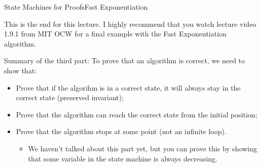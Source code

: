 \begin{frame}{State Machines for Proofs}{Fast Exponentiation}

  This is the end for this lecture. I highly recommend that you watch lecture video 1.9.1 from MIT OCW for a final example with the Fast Exponentiation algorithm.\bigskip

  Summary of the third part: To prove that an algorithm is correct, we need to show that:
  \begin{itemize}
    \item Prove that if the algorihm is in a correct state, it will always stay in the correct state (preserved invariant);
    \item Prove that the algorithm can reach the correct state from the initial position;
    \item Prove that the algorithm stops at some point (not an infinite loop).
    \begin{itemize}
      \item We haven't talked about this part yet, but you can prove this by showing that some variable in the state machine is always decreasing.
    \end{itemize}
  \end{itemize}
\end{frame}
